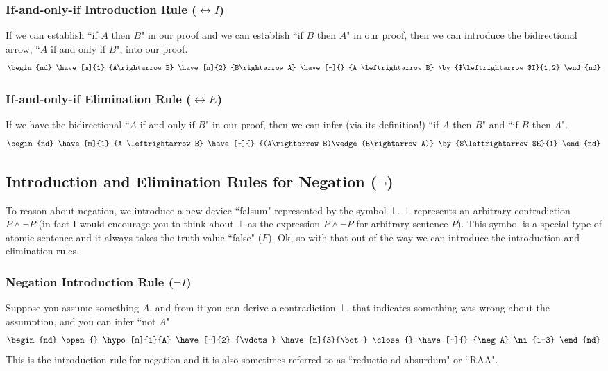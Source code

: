 \subsubsection{If-and-only-if Introduction Rule ($\leftrightarrow I$)}
If we can establish ``if $A$ then $B$" in our proof and we can establish ``if $B$ then $A$" in our proof, then we can introduce the bidirectional arrow, ``$A$ if and only if $B$", into our proof.
\begin{equation}
    \begin{nd}
        \have[m]{1} {A\rightarrow B}
        \have[n]{2} {B\rightarrow A}
        \have[~]{} {A \leftrightarrow B} \by{$\leftrightarrow$I}{1,2}
    \end{nd} \nonumber
\end{equation}
\subsubsection{If-and-only-if Elimination Rule ($\leftrightarrow E$)}
If we have the bidirectional ``$A$ if and only if $B$" in our proof, then we can infer (via its definition!) ``if $A$ then $B$" and ``if $B$ then $A$".
\begin{equation}
    \begin{nd}
        \have[m]{1} {A \leftrightarrow B}
        \have[~]{} {(A\rightarrow B)\wedge (B\rightarrow A)} \by{$\leftrightarrow$E}{1}
    \end{nd} \nonumber
\end{equation}

\subsection{Introduction and Elimination Rules for Negation ($\neg$)}
To reason about negation, we introduce a new device ``falsum" represented by the symbol $\bot$. $\bot$ represents an arbitrary contradiction $P\wedge \neg P$ (in fact I would encourage you to think about $\bot$ as the expression $P \wedge \neg P$ for arbitrary sentence $P$). This symbol is a special type of atomic sentence and it always takes the truth value ``false" ($F$). Ok, so with that out of the way we can introduce the introduction and elimination rules.
\subsubsection{Negation Introduction Rule ($\neg I$)}
Suppose you assume something $A$, and from it you can derive a contradiction $\bot$, that indicates something was wrong about the assumption, and you can infer ``not $A$" 
\begin{equation}
    \begin{nd}
    \open{}
        \hypo[m]{1}{A}
        \have[~]{2} {\vdots}
        \have[n]{3}{\bot}
        \close{}
        \have[~]{} {\neg A} \ni{1-3}
    \end{nd} \nonumber
\end{equation}
This is the introduction rule for negation and it is also sometimes referred to as ``reductio ad absurdum" or ``RAA".

